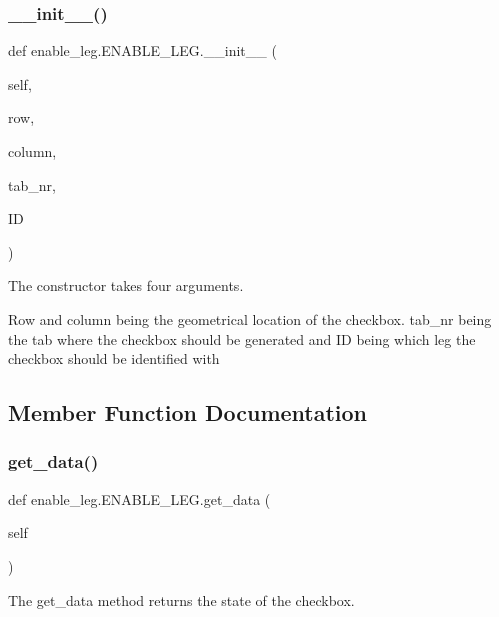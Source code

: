 \subsubsection{\texorpdfstring{\+\_\+\+\_\+init\+\_\+\+\_\+()}{\_\_init\_\_()}}
{\footnotesize\ttfamily def enable\+\_\+leg.\+E\+N\+A\+B\+L\+E\+\_\+\+L\+E\+G.\+\_\+\+\_\+init\+\_\+\+\_\+ (\begin{DoxyParamCaption}\item[{}]{self,  }\item[{}]{row,  }\item[{}]{column,  }\item[{}]{tab\+\_\+nr,  }\item[{}]{ID }\end{DoxyParamCaption})}



The constructor takes four arguments. 

Row and column being the geometrical location of the checkbox. tab\+\_\+nr being the tab where the checkbox should be generated and ID being which leg the checkbox should be identified with 

\subsection{Member Function Documentation}
\mbox{\label{classenable__leg_1_1ENABLE__LEG_a14e5fcc56b5165f4afb0c8a65c944abc}} 
\subsubsection{\texorpdfstring{get\+\_\+data()}{get\_data()}}
{\footnotesize\ttfamily def enable\+\_\+leg.\+E\+N\+A\+B\+L\+E\+\_\+\+L\+E\+G.\+get\+\_\+data (\begin{DoxyParamCaption}\item[{}]{self }\end{DoxyParamCaption})}



The get\+\_\+data method returns the state of the checkbox. 

\mbox{\label{classenable__leg_1_1ENABLE__LEG_ab234553de2df63591e215fe371ff6f77}} 
